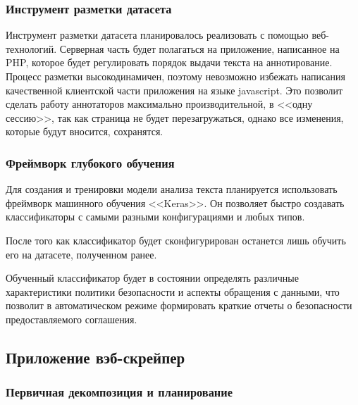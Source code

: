\documentclass[../main]{subfiles}
\begin{document}
\subsubsection{Инструмент разметки датасета}
Инструмент разметки датасета планировалось реализовать с помощью веб-технологий. Серверная часть будет полагаться на приложение, написанное на PHP, которое будет регулировать порядок выдачи текста на аннотирование. Процесс разметки высокодинамичен, поэтому невозможно избежать написания качественной клиентской части приложения на языке javascript. Это позволит сделать работу аннотаторов максимально производительной, в <<одну сессию>>, так как страница не будет перезагружаться, однако все изменения, которые будут вносится, сохранятся.

\subsubsection{Фреймворк глубокого обучения}
Для создания и тренировки модели анализа текста планируется использовать фреймворк машинного обучения <<Keras>>. Он позволяет быстро создавать классификаторы с самыми разными конфигурациями и любых типов.

После того как классификатор будет сконфигурирован останется лишь обучить его на датасете, полученном ранее.

Обученный классификатор будет в состоянии определять различные характеристики политики безопасности и аспекты обращения с данными, что позволит в автоматическом режиме формировать краткие отчеты о безопасности предоставляемого соглашения.

\subsection{Приложение вэб-скрейпер}

\subsubsection{Первичная декомпозиция и планирование}
\end{document}
